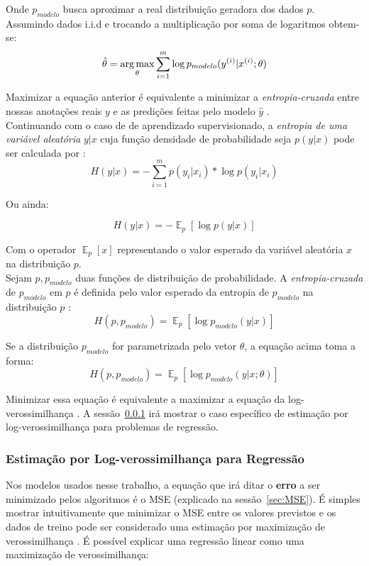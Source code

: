 Onde $p_{modelo}$ busca aproximar a real distribuição geradora dos dados $p$. Assumindo dados i.i.d e trocando a multiplicação por soma de logaritmos obtem-se: \\

\[ \hat{\theta} = \operatorname*{arg\,max}_{\theta} \sum_{i=1}^{m} \log p_{modelo}(y^{(i)}| x^{(i)};\theta) \]

Maximizar a equação anterior é equivalente a minimizar a \textit{entropia-cruzada} entre
nossas anotações reais $y$ e as predições feitas pelo modelo $\hat{y}$
\citep{dlbook}. \\

Continuando com o caso de de aprendizado supervisionado, a \textit{entropia de uma variável aleatória} $y | x$ cuja função densidade
de probabilidade seja $p(y | x)$ pode ser calculada por \citep{shannon2001mathematical}: \\

\[ H(y | x)  = - \sum^m_{i=1} p(y_i | x_i)*\log p(y_i | x_i) \]

Ou ainda:

\[H(y | x) = - \mathop{\mathbb{E}}_p[\log p(y | x)] \]

Com o operador $\mathop{\mathbb{E}}_p[x]$ representando o valor esperado da
variável aleatória $x$ na distribuição $p$. \\

Sejam $p,p_{modelo}$ duas funções de distribuição de probabilidade. A \textit{entropia-cruzada} de $p_{modelo}$ em $p$ é definida pelo valor
esperado da entropia de $p_{modelo}$ na distribuição $p$ \citep{bayesml}: \\

\[H(p,p_{modelo}) =  \mathop{\mathbb{E}}_p[\log p_{modelo}(y | x)] \]

Se a distribuição $p_{modelo}$ for parametrizada pelo vetor $\theta$, a equação
acima toma a forma: \\


\[H(p,p_{modelo}) =  \mathop{\mathbb{E}}_p[\log p_{modelo}(y | x ; \theta)] \]

Minimizar essa equação é equivalente a maximizar a equação da
log-verossimilhança \citep{dlbook}. A sessão~\ref{sec:reglog} irá mostrar o caso
específico de estimação por log-verossimilhança para problemas de regressão.  

\subsubsection{Estimação por Log-verossimilhança para Regressão}
\label{sec:reglog}
Nos modelos usados nesse trabalho, a equação que irá ditar o \textbf{erro} a ser
minimizado pelos algoritmos é o MSE (explicado na sessão~\ref{sec:MSE}). 
É simples mostrar intuitivamente que minimizar o MSE entre os valores previstos
e os dados de treino pode ser considerado uma estimação por maximização de
verossimilhança \citep{dlbook}. É possível explicar uma regressão linear como
uma maximização de verossimilhança:
\\

